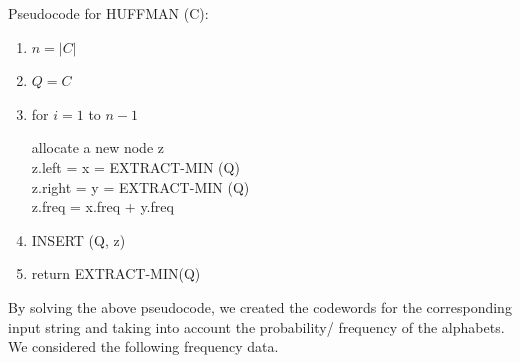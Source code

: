 \documentclass{article}
\begin{document}
\Large{Pseudocode for HUFFMAN (C): 
\begin{enumerate}
\item $n = |C|$
\item $Q = C$
\item for $i = 1$ to $n-1$
\begin{center}
allocate a new node z \\
z.left = x = EXTRACT-MIN (Q) \\
z.right = y = EXTRACT-MIN (Q) \\
z.freq = x.freq + y.freq \\
\end{center}
\item INSERT (Q, z)
\item return EXTRACT-MIN(Q)
\end{enumerate}

\vspace{.4cm}

By solving the above pseudocode, we created the codewords for the corresponding input string and taking into account the probability/ frequency of the alphabets. We considered the following frequency data.
}
\end{document}
